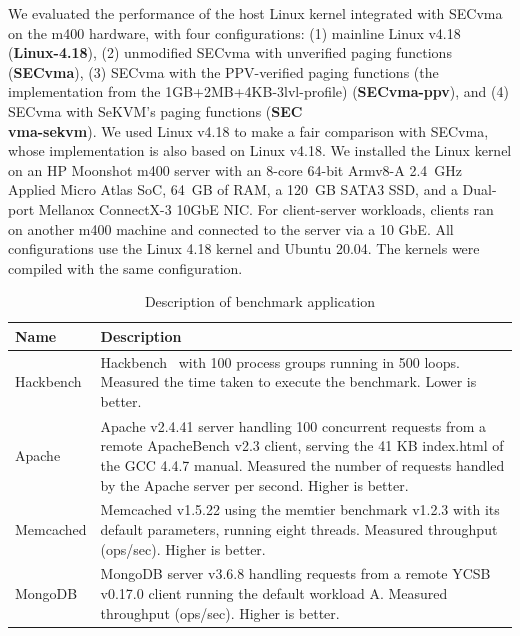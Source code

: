 We evaluated the performance of the host Linux kernel integrated with SECvma on the m400 hardware, with four configurations: (1) mainline Linux v4.18 (\textbf{Linux-4.18}), (2) unmodified SECvma with unverified paging functions (\textbf{SECvma}), (3) SECvma with the PPV-verified paging functions (the implementation from the 1GB+2MB+4KB-3lvl-profile) (\textbf{SECvma-ppv}), and (4) SECvma with SeKVM's paging functions (\textbf{SEC\\vma-sekvm}). We used Linux v4.18 to make a fair comparison with SECvma, whose implementation is also based on Linux v4.18. We installed the Linux kernel on an HP Moonshot m400 server with an 8-core 64-bit Armv8-A 2.4~GHz Applied Micro Atlas SoC, 64~GB of RAM, a 120~GB SATA3 SSD, and a Dual-port Mellanox ConnectX-3 10GbE NIC. For client-server workloads, clients ran on another m400 machine and connected to the server via a 10 GbE. All configurations use the Linux 4.18 kernel and Ubuntu 20.04. The kernels were compiled with the same configuration.

\begin{table}[t]
\centering
\caption{Description of benchmark application}
\label{tbl:macro}
\footnotesize
\begin{tabular}{ |p{1.5cm}|p{6.00cm}| }
    \hline
    \textbf{Name} & \textbf{Description} \\
    \hline 
     Hackbench & Hackbench~\cite{hackbench} with 100 process groups running in 500 loops. Measured the time taken to execute the benchmark. Lower is better.\\
    \hline
    Apache & Apache v2.4.41 server handling 100 concurrent requests from a remote ApacheBench \cite{ab} v2.3 client, serving the 41 KB index.html of the GCC 4.4.7 manual. Measured the number of requests handled by the Apache server per second. Higher is better. \\ 
    \hline 
    Memcached & Memcached v1.5.22 using the memtier benchmark\cite{memtier} v1.2.3 with its default parameters, running eight threads. Measured throughput (ops/sec). Higher is better. \\
    \hline
    MongoDB & MongoDB server v3.6.8 handling requests from a remote YCSB\cite{cooper2010benchmarking} v0.17.0 client running the default workload A. Measured throughput (ops/sec). Higher is better. \\ %
    \hline
\end{tabular}
\end{table}

